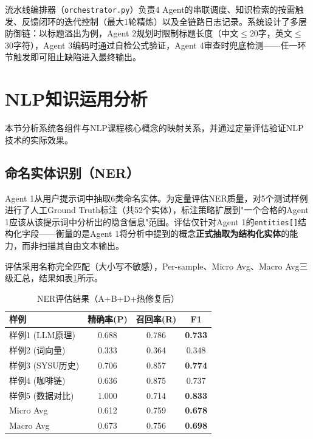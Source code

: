 \documentclass[11pt,a4paper]{article}
\begin{document}
流水线编排器（\texttt{orchestrator.py}）负责4 Agent的串联调度、知识检索的按需触发、反馈闭环的迭代控制（最大1轮精炼）以及全链路日志记录。系统设计了多层防御链：以标题溢出为例，Agent 2规划时限制标题长度（中文$\le$20字，英文$\le$30字符），Agent 3编码时通过自检公式验证，Agent 4审查时兜底检测——任一环节触发即可阻止缺陷进入最终输出。

\section{NLP知识运用分析}

本节分析系统各组件与NLP课程核心概念的映射关系，并通过定量评估验证NLP技术的实际效果。

\subsection{命名实体识别（NER）}

Agent 1从用户提示词中抽取6类命名实体。为定量评估NER质量，对5个测试样例进行了人工Ground Truth标注（共52个实体），标注策略扩展到"一个合格的Agent 1应该从该提示词中分析出的隐含信息"范围。评估仅针对Agent 1的\texttt{entities[]}结构化字段——衡量的是Agent 1将分析中提到的概念\textbf{正式抽取为结构化实体}的能力，而非扫描其自由文本输出。

评估采用名称完全匹配（大小写不敏感），Per-sample、Micro Avg、Macro Avg三级汇总，结果如表\ref{tab:ner}所示。

\begin{table}[H]
\centering
\caption{NER评估结果（A+B+D+热修复后）}
\label{tab:ner}
\begin{tabular}{lccc}
\toprule
样例 & 精确率(P) & 召回率(R) & F1 \\
\midrule
样例1 (LLM原理) & 0.688 & 0.786 & \textbf{0.733} \\
样例2 (词向量) & 0.333 & 0.364 & 0.348 \\
样例3 (SYSU历史) & 0.706 & 0.857 & \textbf{0.774} \\
样例4 (咖啡链) & 0.636 & 0.875 & 0.737 \\
样例5 (数据对比) & 1.000 & 0.714 & \textbf{0.833} \\
\midrule
Micro Avg & 0.612 & 0.759 & \textbf{0.678} \\
Macro Avg & 0.673 & 0.756 & \textbf{0.698} \\
\bottomrule
\end{tabular}
\end{table}
\end{document}
